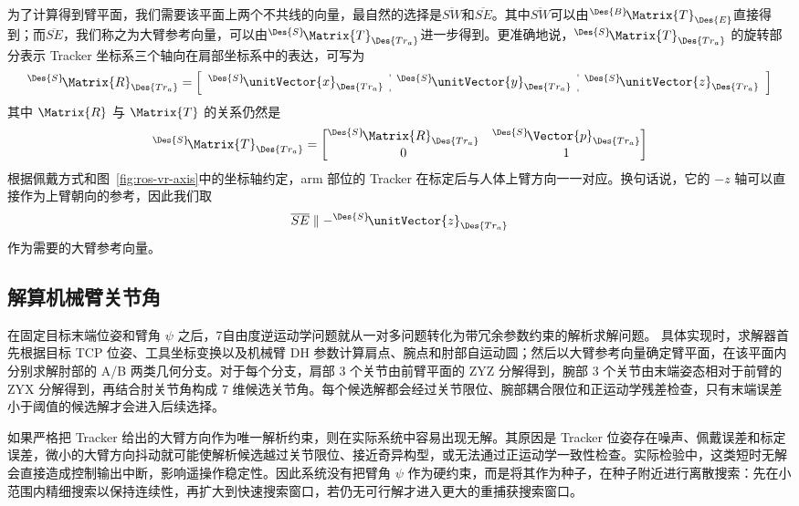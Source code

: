 为了计算得到臂平面，我们需要该平面上两个不共线的向量，最自然的选择是$\overline{SW}$和$\overline{SE}$。其中$\overline{SW}$可以由${}^{\Des{B}}\!\Matrix{T}_{\Des{E}}$直接得到；而$\overline{SE}$，我们称之为大臂参考向量，可以由${}^{\Des{S}}\!\Matrix{T}_{\Des{Tr_a}}$进一步得到。更准确地说，${}^{\Des{S}}\!\Matrix{T}_{\Des{Tr_a}}$ 的旋转部分表示 Tracker 坐标系三个轴向在肩部坐标系中的表达，可写为
\begin{equation}
    {}^{\Des{S}}\!\Matrix{R}_{\Des{Tr_a}} =
    \left[
        \begin{array}{c:c:c}
            {}^{\Des{S}}\!\unitVector{x}_{\Des{Tr_a}} &
            {}^{\Des{S}}\!\unitVector{y}_{\Des{Tr_a}} &
            {}^{\Des{S}}\!\unitVector{z}_{\Des{Tr_a}}
        \end{array}
    \right]
\end{equation}
其中 $\Matrix{R}$ 与 $\Matrix{T}$ 的关系仍然是
\begin{equation}
    {}^{\Des{S}}\!\Matrix{T}_{\Des{Tr_a}} =
    \begin{bmatrix}
        {}^{\Des{S}}\!\Matrix{R}_{\Des{Tr_a}} &
        {}^{\Des{S}}\!\Vector{p}_{\Des{Tr_a}} \\
        0 & 1
    \end{bmatrix}
\end{equation}
根据佩戴方式和图~\ref{fig:ros-vr-axis}中的坐标轴约定，arm 部位的 Tracker 在标定后与人体上臂方向一一对应。换句话说，它的 $-z$ 轴可以直接作为上臂朝向的参考，因此我们取
\begin{equation}
    \overline{SE} \parallel -{}^{\Des{S}}\!\unitVector{z}_{\Des{Tr_a}}
\end{equation}
作为需要的大臂参考向量。

\subsection{解算机械臂关节角}
在固定目标末端位姿和臂角 $\psi$ 之后，7自由度逆运动学问题就从一对多问题转化为带冗余参数约束的解析求解问题。
具体实现时，求解器首先根据目标 TCP 位姿、工具坐标变换以及机械臂 DH 参数计算肩点、腕点和肘部自运动圆；然后以大臂参考向量确定臂平面，在该平面内分别求解肘部的 A/B 两类几何分支。对于每个分支，肩部 3 个关节由前臂平面的 ZYZ 分解得到，腕部 3 个关节由末端姿态相对于前臂的 ZYX 分解得到，再结合肘关节角构成 7 维候选关节角。每个候选解都会经过关节限位、腕部耦合限位和正运动学残差检查，只有末端误差小于阈值的候选解才会进入后续选择。

如果严格把 Tracker 给出的大臂方向作为唯一解析约束，则在实际系统中容易出现无解。其原因是 Tracker 位姿存在噪声、佩戴误差和标定误差，微小的大臂方向抖动就可能使解析候选越过关节限位、接近奇异构型，或无法通过正运动学一致性检查。实际检验中，这类短时无解会直接造成控制输出中断，影响遥操作稳定性。因此系统没有把臂角 $\psi$ 作为硬约束，而是将其作为种子，在种子附近进行离散搜索：先在小范围内精细搜索以保持连续性，再扩大到快速搜索窗口，若仍无可行解才进入更大的重捕获搜索窗口。


